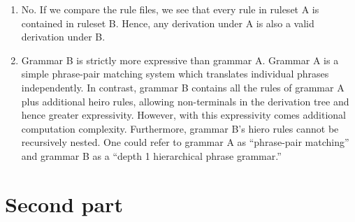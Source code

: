 \documentclass[a4paper,oneside,reqno]{amsart}
\begin{document}
\begin{enumerate}[label=\arabic*.]
  \item No. If we compare the rule files, we see that every rule in ruleset A is
    contained in ruleset B. Hence, any derivation under A is also a valid derivation under
    B.

  \item Grammar B is strictly more expressive than grammar A. Grammar A is a
    simple phrase-pair matching system which translates individual phrases
    independently. In contrast, grammar B contains all the rules of grammar A
    plus additional heiro rules, allowing non-terminals in the derivation tree
    and hence greater expressivity. However, with this expressivity comes additional
    computation complexity. Furthermore, grammar B's hiero rules cannot be recursively
    nested. One could refer to grammar A as ``phrase-pair matching'' and
    grammar B as a ``depth 1 hierarchical phrase grammar.''
\end{enumerate}

\section{Second part}
\end{document}
